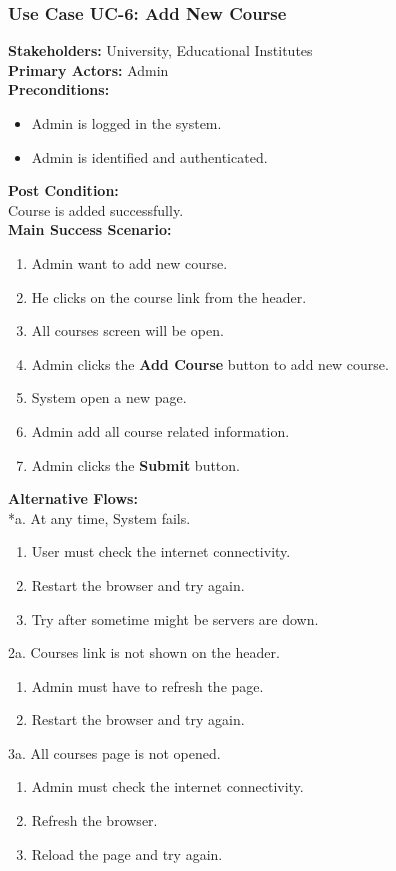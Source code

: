 \documentclass[12pt]{article}
\begin{document}
\subsubsection{Use Case UC-6: Add New Course}
\textbf{Stakeholders: } University, Educational Institutes \\
\textbf{Primary Actors: } Admin \\
\textbf{Preconditions:}
\begin{itemize}
\item Admin is logged in the system.
\item Admin is identified and authenticated.
\end{itemize}
\textbf{Post Condition: }\\
Course is added successfully.\\
\textbf{Main Success Scenario:}
\begin{enumerate}
\item Admin want to add new course.
\item He clicks on the course link from the header.
\item All courses screen will be open.
\item Admin clicks the \textbf{Add Course} button to add new course.
\item System open a new page.
\item Admin add all course related information.
\item Admin clicks the \textbf{Submit} button. 
\end{enumerate}
\textbf{Alternative Flows:}\\
*a. At any time, System fails.
\begin{enumerate}
\item User must check the internet connectivity.
\item Restart the browser and try again.
\item Try after sometime might be servers are down.
\end{enumerate}
2a. Courses link is not shown on the header.
\begin{enumerate}
\item Admin must have to refresh the page.
\item Restart the browser and try again.
\end{enumerate} 
3a. All courses page is not opened.
\begin{enumerate}
\item Admin must check the internet connectivity.
\item Refresh the browser.
\item Reload the page and try again.
\end{enumerate}
\end{document}
